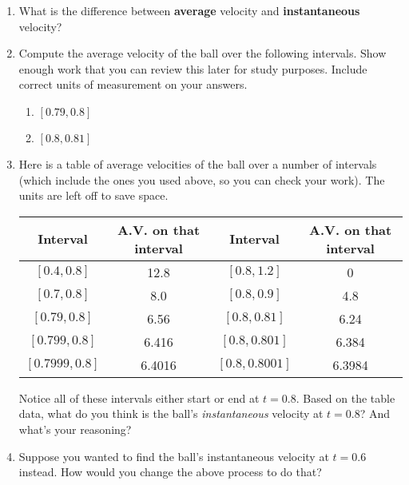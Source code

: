 \documentclass[11pt]{article}
\begin{document}
\begin{enumerate}
	\item What is the difference between \textbf{average} velocity and \textbf{instantaneous} velocity? 
	
	\vspace{1in}
	
	\item Compute the average velocity of the ball over the following intervals. Show enough work that you can review this later for study purposes. Include correct units of measurement on your answers. 
	\begin{enumerate}
		\item $[0.79, 0.8]$
		\vspace{0.5in}
		
		\item $[0.8, 0.81]$
		\vspace{0.5in}
		
	\end{enumerate}
	
	\item Here is a table of average velocities of the ball over a number of intervals (which include the ones you used above, so you can check your work). The units are left off to save space. 
	
	\begin{center}
		\begin{tabular}{c|c||c|c}
		Interval  & A.V. on that interval & Interval & A.V. on that interval \\ \hline
		$[0.4, 0.8]$ & 12.8 & $[0.8, 1.2]$ & 0 \\ 
		$[0.7, 0.8]$ & 8.0 & $[0.8, 0.9]$ & 4.8 \\
		$[0.79, 0.8]$ & 6.56 & $[0.8, 0.81]$ & 6.24 \\
		$[0.799, 0.8]$ & 6.416 & $[0.8, 0.801]$ & 6.384 \\
		$[0.7999, 0.8]$ & 6.4016 & $[0.8, 0.8001]$ & 6.3984\\
 		\end{tabular}
	\end{center}
	
	Notice all of these intervals either start or end at $t = 0.8$. Based on the table data, what do you think is the ball's \emph{instantaneous} velocity at $t = 0.8$? And what's your reasoning? 
	
	\vspace{1in}
	
	\item Suppose you wanted to find the ball's instantaneous velocity at $t = 0.6$ instead. How would you change the above process to do that? 
	
	

\end{enumerate}
\end{document}
